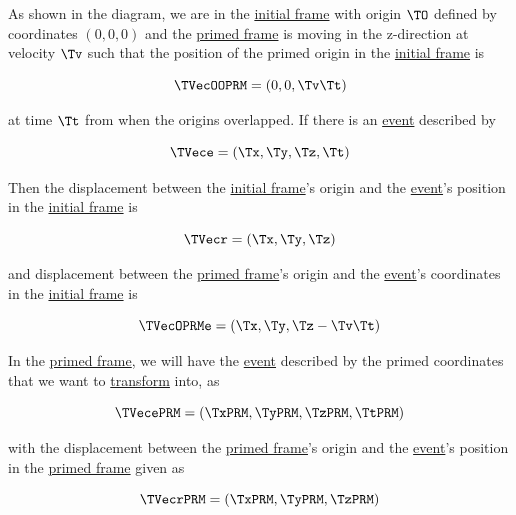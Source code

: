 As shown in the diagram, we are in the \hyperlink{def-initial-Frame}{initial frame} with origin ${\TO }$ defined by coordinates $(0,0,0)$ and the \hyperlink{def-Primed-Frame}{primed frame} is moving in the z-direction at velocity ${\Tv }$ such that the position of the primed origin in the \hyperlink{def-initial-Frame}{initial frame} is

\begin{equation}
	\TVecOOPRM  = (0,0,{\Tv }{\Tt })
\end{equation}

at time ${\Tt }$ from when the origins overlapped.
If there is an \hyperlink{def-event}{event} described by

\begin{equation}
	\TVece  = ({\Tx },{\Ty },{\Tz },{\Tt })
\end{equation}

Then the displacement between the \hyperlink{def-initial-Frame}{initial frame}'s origin and the \hyperlink{def-event}{event}'s position in the \hyperlink{def-initial-Frame}{initial frame} is

\begin{equation}
	\TVecr  = ({\Tx },{\Ty },{\Tz })
\end{equation}

and displacement between the \hyperlink{def-Primed-Frame}{primed frame}'s origin and the \hyperlink{def-event}{event}'s coordinates in the \hyperlink{def-initial-Frame}{initial frame} is

\begin{equation}
	\TVecOPRMe = ({\Tx },{\Ty },{\Tz }-{\Tv }{\Tt })
\end{equation}

In the \hyperlink{def-Primed-Frame}{primed frame}, we will have the \hyperlink{def-event}{event} described by the primed coordinates that we want to \hyperlink{def-transform}{transform} into, as

\begin{equation}
	\TVecePRM  = ({\TxPRM  },{\TyPRM  },{\TzPRM  },\TtPRM )
\end{equation}

with the displacement between the \hyperlink{def-Primed-Frame}{primed frame}'s origin and the \hyperlink{def-event}{event}'s position in the \hyperlink{def-Primed-Frame}{primed frame} given as

\begin{equation}
	{\TVecrPRM  } = ({\TxPRM  },{\TyPRM  },{\TzPRM  })
\end{equation}

